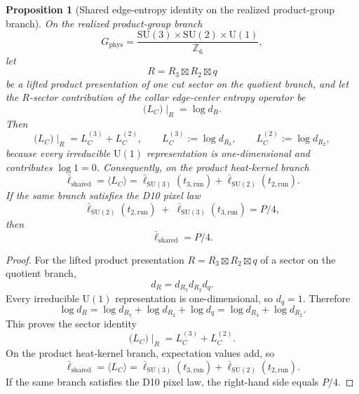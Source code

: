 \documentclass[11pt]{article}
\newtheorem{proposition}[theorem]{Proposition}
\newcommand{\SU}{\mathrm{SU}}
\newcommand{\U}{\mathrm{U}}
\newcommand{\ellbar}{\bar{\ell}}
\begin{document}
\begin{proposition}[Shared edge-entropy identity on the realized product-group branch]\label{prop:sharededgeentropy}
On the realized product-group branch
\[
G_{\mathrm{phys}}
=
\frac{\SU(3)\times\SU(2)\times\U(1)}{\mathbb Z_6},
\]
let
\[
R=R_3\boxtimes R_2\boxtimes q
\]
be a lifted product presentation of one cut sector on the quotient branch, and let the
\(R\)-sector contribution of the collar edge-center entropy operator be
\[
\bigl(L_C\bigr)\!\mid_R=\log d_R.
\]
Then
\[
\bigl(L_C\bigr)\!\mid_R
=
L_C^{(3)}+L_C^{(2)},
\qquad
L_C^{(3)}:=\log d_{R_3},
\qquad
L_C^{(2)}:=\log d_{R_2},
\]
because every irreducible \( \U(1) \) representation is one-dimensional and contributes \(\log 1=0\). Consequently, on the product heat-kernel branch
\[
\ellbar_{\mathrm{shared}}
=
\langle L_C\rangle
=
\ellbar_{\mathrm{SU(3)}}(t_{3,\mathrm{run}})
+
\ellbar_{\mathrm{SU(2)}}(t_{2,\mathrm{run}}).
\]
If the same branch satisfies the D10 pixel law
\[
\ellbar_{\mathrm{SU(2)}}(t_{2,\mathrm{run}})
\;+\;
\ellbar_{\mathrm{SU(3)}}(t_{3,\mathrm{run}})
=
P/4,
\]
then
\[
\ellbar_{\mathrm{shared}}=P/4.
\]
\end{proposition}

\begin{proof}
For the lifted product presentation \(R=R_3\boxtimes R_2\boxtimes q\) of a sector on the quotient
branch,
\[
d_R=d_{R_3}d_{R_2}d_q.
\]
Every irreducible \( \U(1) \) representation is one-dimensional, so \(d_q=1\). Therefore
\[
\log d_R
=
\log d_{R_3}+\log d_{R_2}+\log d_q
=
\log d_{R_3}+\log d_{R_2}.
\]
This proves the sector identity
\[
\bigl(L_C\bigr)\!\mid_R=L_C^{(3)}+L_C^{(2)}.
\]
On the product heat-kernel branch, expectation values add, so
\[
\ellbar_{\mathrm{shared}}
=
\langle L_C\rangle
=
\ellbar_{\mathrm{SU(3)}}(t_{3,\mathrm{run}})
+
\ellbar_{\mathrm{SU(2)}}(t_{2,\mathrm{run}}).
\]
If the same branch satisfies the D10 pixel law, the right-hand side equals \(P/4\). \qedhere
\end{proof}
\end{document}

